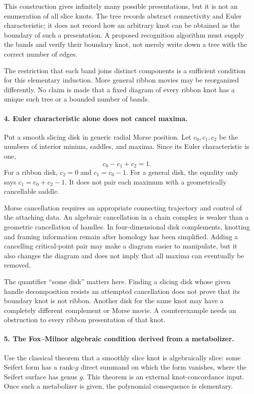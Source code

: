 \documentclass[11pt]{article}
\begin{document}
This construction gives infinitely many possible presentations, but it is not an enumeration of all slice knots. The tree records abstract connectivity and Euler characteristic; it does not record how an arbitrary knot can be obtained as the boundary of such a presentation. A proposed recognition algorithm must supply the bands and verify their boundary knot, not merely write down a tree with the correct number of edges.

The restriction that each band joins distinct components is a sufficient condition for this elementary induction. More general ribbon movies may be reorganized differently. No claim is made that a fixed diagram of every ribbon knot has a unique such tree or a bounded number of bands.

\paragraph{4. Euler characteristic alone does not cancel maxima.}
Put a smooth slicing disk in generic radial Morse position. Let $c_0,c_1,c_2$ be the numbers of interior minima, saddles, and maxima. Since its Euler characteristic is one,
\[
 c_0-c_1+c_2=1.
\]
For a ribbon disk, $c_2=0$ and $c_1=c_0-1$. For a general disk, the equality only says $c_1=c_0+c_2-1$. It does not pair each maximum with a geometrically cancellable saddle.

Morse cancellation requires an appropriate connecting trajectory and control of the attaching data. An algebraic cancellation in a chain complex is weaker than a geometric cancellation of handles. In four-dimensional disk complements, knotting and framing information remain after homology has been simplified. Adding a cancelling critical-point pair may make a diagram easier to manipulate, but it also changes the diagram and does not imply that all maxima can eventually be removed.

The quantifier ``some disk'' matters here. Finding a slicing disk whose given handle decomposition resists an attempted cancellation does not prove that its boundary knot is not ribbon. Another disk for the same knot may have a completely different complement or Morse movie. A counterexample needs an obstruction to every ribbon presentation of that knot.

\paragraph{5. The Fox--Milnor algebraic condition derived from a metabolizer.}
Use the classical theorem that a smoothly slice knot is algebraically slice: some Seifert form has a rank-$g$ direct summand on which the form vanishes, where the Seifert surface has genus $g$. This theorem is an external knot-concordance input. Once such a metabolizer is given, the polynomial consequence is elementary.
\end{document}
